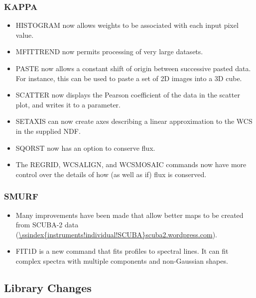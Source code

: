 \subsubsection{KAPPA}
\begin{itemize}
\item HISTOGRAM now allows weights to be associated with each input pixel value.
\item MFITTREND now permits processing of very large datasets.
\item PASTE now allows a constant shift of origin between successive pasted data. For instance, this can be used to paste a set of 2D images into a 3D cube.
\item SCATTER now displays the Pearson coefficient of the data in the scatter plot, and writes it to a parameter.
\item SETAXIS can now create axes describing a linear approximation to the WCS in the supplied NDF.
\item SQORST now has an option to conserve flux.
\item The REGRID, WCSALIGN, and WCSMOSAIC commands now have more control over the details of how (as well as if) flux is conserved.
\end{itemize}

\subsubsection{SMURF}
\begin{itemize}
\item Many improvements have been made that allow better maps to be created from SCUBA-2 data (\url{\ssindex{instruments!individual!SCUBA}scuba2.wordpress.com}).
\item FIT1D is a new command that fits profiles to spectral lines.  It can fit complex spectra with multiple components and non-Gaussian shapes.
\end{itemize}


\subsection{Library Changes}

